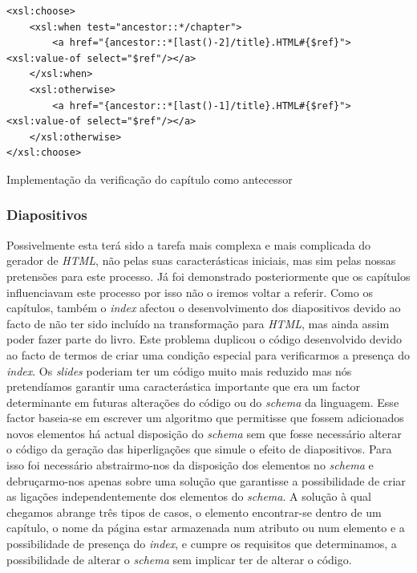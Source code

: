 \documentclass[a4paper]{article}
\begin{document}
\begin{footnotesize}                        
\begin{lstlisting}
<xsl:choose>
    <xsl:when test="ancestor::*/chapter">
        <a href="{ancestor::*[last()-2]/title}.HTML#{$ref}"><xsl:value-of select="$ref"/></a>
    </xsl:when>
    <xsl:otherwise>
        <a href="{ancestor::*[last()-1]/title}.HTML#{$ref}"><xsl:value-of select="$ref"/></a>
    </xsl:otherwise>
</xsl:choose>
\end{lstlisting}
\begin{center}
\caption{Implementação da verificação do capítulo como antecessor}
\end{center}
\end{footnotesize}

\subsubsection{Diapositivos}

\hspace{1cm}Possivelmente esta terá sido a tarefa mais complexa e mais complicada do gerador de \emph{HTML}, não pelas suas caracterásticas iniciais, mas sim pelas nossas pretensões para este processo. Já foi demonstrado posteriormente que os capítulos influenciavam este processo por isso não o iremos voltar a referir. Como os capítulos, também o \emph{index} afectou o desenvolvimento dos diapositivos devido ao facto de não ter sido incluído na transformação para \emph{HTML}, mas ainda assim poder fazer parte do livro. Este problema duplicou o código desenvolvido devido ao facto de termos de criar uma condição especial para verificarmos a presença do \emph{index}. Os \emph{slides} poderiam ter um código muito mais reduzido mas nós pretendíamos garantir uma caracterástica importante que era um factor determinante em futuras alterações do código ou do \emph{schema} da linguagem. Esse factor baseia-se em escrever um algoritmo que permitisse que fossem adicionados novos elementos há actual disposição do \emph{schema} sem que fosse necessário alterar o código da geração das hiperligações que simule o efeito de diapositivos. Para isso foi necessário abstrairmo-nos da disposição dos elementos no \emph{schema} e debruçarmo-nos apenas sobre uma solução que garantisse a possibilidade de criar as ligações independentemente dos elementos do \emph{schema}. A solução à qual chegamos abrange três tipos de casos, o elemento encontrar-se dentro de um capítulo, o nome da página estar armazenada num atributo ou num elemento e a possibilidade de presença do \emph{index}, e cumpre os requisitos que determinamos, a possibilidade de alterar o \emph{schema} sem implicar ter de alterar o código.\\
\end{document}
